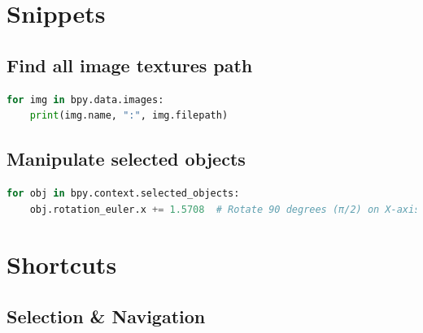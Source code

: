 \documentclass{article}
\begin{document}
\section{Snippets}

\subsection{Find all image textures path}
\begin{lstlisting}[language=Python]
for img in bpy.data.images:
    print(img.name, ":", img.filepath)
\end{lstlisting}

\subsection{Manipulate selected objects}
\begin{lstlisting}[language=Python]
for obj in bpy.context.selected_objects:
    obj.rotation_euler.x += 1.5708  # Rotate 90 degrees (π/2) on X-axis
\end{lstlisting}

\section{Shortcuts}

\subsection{Selection \& Navigation}
\end{document}
